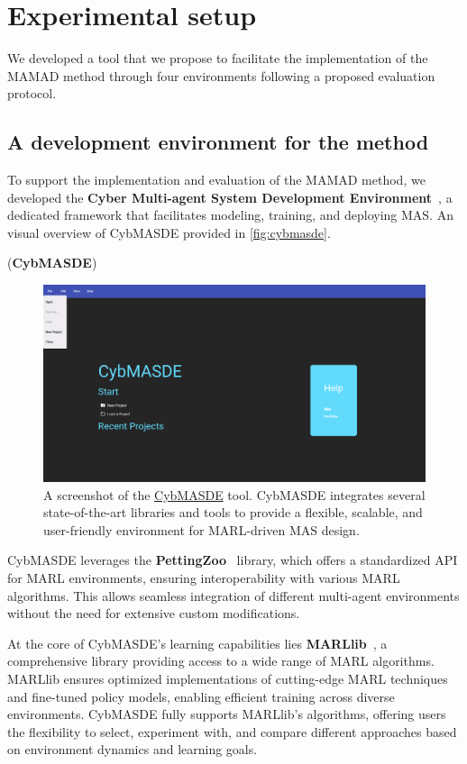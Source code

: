 \documentclass[pdflatex,sn-mathphys-num]{sn-jnl}%
\theoremstyle{thmstyleone}%
\theoremstyle{thmstyletwo}%
\theoremstyle{thmstylethree}%
\begin{document}
\section{Experimental setup}
\label{sec:experimental_setup}

We developed a tool that we propose to facilitate the implementation of the MAMAD method through four environments following a proposed evaluation protocol.

\subsection{A development environment for the method}

To support the implementation and evaluation of the MAMAD method, we developed the \textbf{Cyber Multi-agent System Development Environment}~\footnotemark[1], a dedicated framework that facilitates modeling, training, and deploying MAS. An visual overview of CybMASDE provided in \autoref{fig:cybmasde}.

 (\textbf{CybMASDE})

\begin{figure}[h!]
    \centering
    \includegraphics[width=0.7\linewidth]{figures/CybMASDE.png}
    \caption{A screenshot of the \href{https://github.com/julien6/CybMASDE}{CybMASDE} tool. CybMASDE integrates several state-of-the-art libraries and tools to provide a flexible, scalable, and user-friendly environment for MARL-driven MAS design.}
    \label{fig:cybmasde}
\end{figure}


CybMASDE leverages the \textbf{PettingZoo}~\cite{Terry2021} library, which offers a standardized API for MARL environments, ensuring interoperability with various MARL algorithms. This allows seamless integration of different multi-agent environments without the need for extensive custom modifications.

At the core of CybMASDE's learning capabilities lies \textbf{MARLlib}~\cite{hu2022marllib}, a comprehensive library providing access to a wide range of MARL algorithms. MARLlib ensures optimized implementations of cutting-edge MARL techniques and fine-tuned policy models, enabling efficient training across diverse environments. CybMASDE fully supports MARLlib's algorithms, offering users the flexibility to select, experiment with, and compare different approaches based on environment dynamics and learning goals.
\end{document}
